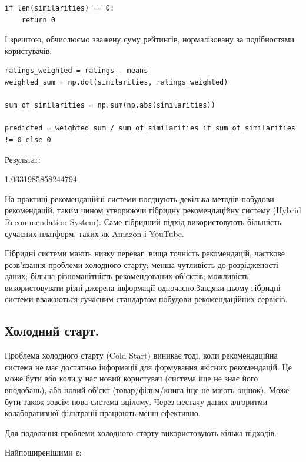 \begin{lstlisting}
if len(similarities) == 0:
    return 0
\end{lstlisting}

І зрештою, обчислюємо зважену суму рейтингів, нормалізовану за подібностями користувачів:

\begin{lstlisting}
ratings_weighted = ratings - means
weighted_sum = np.dot(similarities, ratings_weighted)
    
sum_of_similarities = np.sum(np.abs(similarities))

predicted = weighted_sum / sum_of_similarities if sum_of_similarities != 0 else 0
\end{lstlisting}

Результат:

\begin{console}
1.0331985858244794
\end{console}

 На практиці рекомендаційні системи поєднують декілька методів побудови рекомендацій, таким чином утворюючи гібридну рекомендаційну систему (Hybrid Recommendation System). Саме гібридний підхід використовують більшість сучасних платформ, таких як Amazon і YouTube.

Гібридні системи мають низку переваг: вища точність рекомендацій, часткове розв'язання проблеми холодного старту; менша чутливість до розрідженості даних; більша різноманітність рекомендованих об'єктів; можливість використовувати різні джерела інформації одночасно.Завдяки цьому гібридні системи вважаються сучасним стандартом побудови рекомендаційних сервісів.

\subsection{Холодний старт.}

Проблема холодного старту (Cold Start) виникає тоді, коли рекомендаційна система не має достатньо інформації для формування якісних рекомендацій. Це може бути або коли у нас новий користувач (система іще не знає його вподобань), або новий об'єкт (товар/фільм/книга іще не мають оцінок). Може бути також зовсім нова система вцілому. Через нестачу даних алгоритми колаборативної фільтрації працюють менш ефективно.

Для подолання проблеми холодного старту використовують кілька підходів.

Найпоширенішими є:

